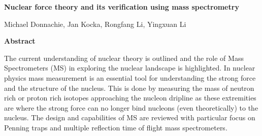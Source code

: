 \documentclass[a4paper]{article}
\begin{document}
\begin{center}
    \huge \textbf{Nuclear force theory and its verification using mass spectrometry}
\end{center}

\vspace{-1em}

\begin{center}
    Michael Donnachie, Jan Kocka, Rongfang Li, Yingxuan Li
\end{center}

\vspace{0.5em}

\begin{center}
    \textbf{\Large Abstract}
    \begin{adjustwidth}{1.5em}{1.5em}
        The current understanding of nuclear theory is outlined and the role of Mass Spectrometers (MS) in exploring the nuclear landscape is highlighted. In nuclear physics mass measurement is an essential tool for understanding the strong force and the structure of the nucleus. This is done by measuring the mass of neutron rich or proton rich isotopes approaching the nucleon dripline as these extremities are where the strong force can no longer bind nucleons (even theoretically) to the nucleus. The design and capabilities of MS are reviewed with particular focus on Penning traps and multiple reflection time of flight mass spectrometers.
    \end{adjustwidth}
\end{center}

\vspace{1em}

\begin{multicols}{2}

    
    
    
    
    
    
    
    \printbibliography
\end{multicols}
\end{document}
